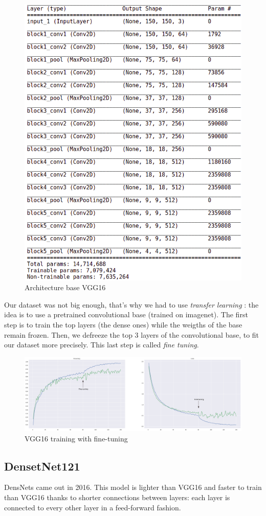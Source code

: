 \documentclass[a4paper]{article}
\begin{document}
\begin{figure}[h]
    \centering
\includegraphics[width=.6\textwidth]{figures/architecture_vgg16.png}
\caption{Architecture base VGG16}
\end{figure}

Our dataset was not big enough, that's why we had to use \textit{transfer learning} : the idea is to use a pretrained convolutional base (trained on imagenet).
The first step is to train the top layers (the dense ones) while the weigths of the base remain frozen. Then, we defreeze the top 3 layers of the  convolutional base, to fit our dataset more precisely. This last step is called \textit{fine tuning}.

\begin{figure}[h]
    \centering
\includegraphics[width=.8\textwidth]{figures/vgg16_graph_caption.png}
\caption{VGG16 training with fine-tuning}
\end{figure}

\newpage
\subsection{DensetNet121}
DensNets came out in 2016. 
This model is lighter than VGG16 and faster to train than VGG16 thanks to shorter connections between layers: each layer is connected to every other layer in a feed-forward fashion. 
\end{document}

